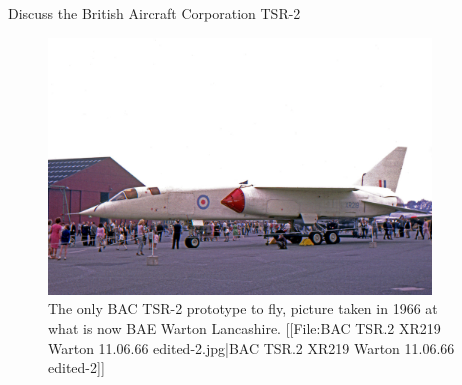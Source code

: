 \documentclass[12pt,letter]{article}
\numberwithin{ex}{section} %
\numberwithin{re}{section} %
\newtheorem{vcs}{Vibration Case Studies}
\numberwithin{vcs}{section} %
\newenvironment{vibration_case_studies}{\begin{mdframed}[linecolor=orange,middlelinewidth=2mm,roundcorner=20pt]\begin{vcs}\normalfont}{\end{vcs}\end{mdframed}}
\newcommand{\bl}[1]{\textcolor[rgb]{0.00,0.00,1.00}{#1}}
\begin{document}
		\begin{vibration_case_studies}
			Discuss the British Aircraft Corporation TSR-2
			\begin{figure}[H]
				\centering
				\includegraphics[width=4in]{../figures/TSR_2}
				\caption{The only BAC TSR-2 prototype to fly, picture taken in 1966 at what is now BAE Warton Lancashire. \bl{[[File:BAC TSR.2 XR219 Warton 11.06.66 edited-2.jpg|BAC TSR.2 XR219 Warton 11.06.66 edited-2]]}}
			\end{figure}	
		\end{vibration_case_studies}
	
\end{document}
